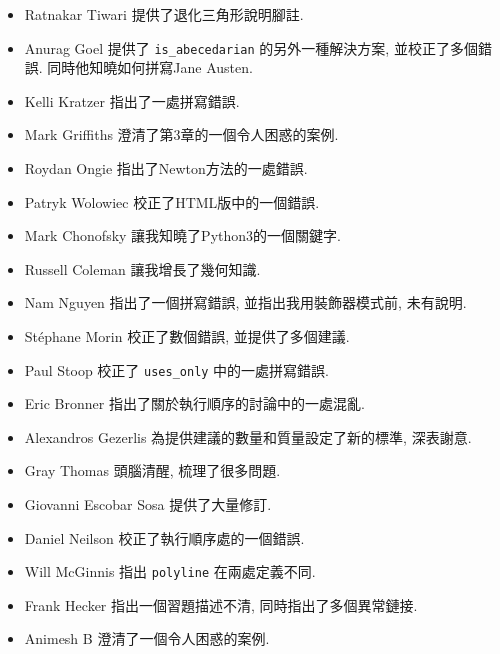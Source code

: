 \documentclass[10pt]{book}
\begin{document}
\begin{itemize}
\item Ratnakar Tiwari 提供了退化三角形說明腳註. 

\item Anurag Goel 提供了 \verb"is_abecedarian"
的另外一種解決方案, 並校正了多個錯誤. 同時他知曉如何拼寫Jane Austen. 

\item Kelli Kratzer 指出了一處拼寫錯誤. 

\item Mark Griffiths 澄清了第3章的一個令人困惑的案例. 

\item Roydan Ongie 指出了Newton方法的一處錯誤. 

\item Patryk Wolowiec 校正了HTML版中的一個錯誤. 

\item Mark Chonofsky 讓我知曉了Python3的一個關鍵字. 

\item Russell Coleman 讓我增長了幾何知識. 

\item Nam Nguyen 指出了一個拼寫錯誤, 並指出我用裝飾器模式前, 未有說明. 

\item St\'{e}phane Morin 校正了數個錯誤, 並提供了多個建議. 

\item Paul Stoop 校正了 \verb+uses_only+ 中的一處拼寫錯誤. 

\item Eric Bronner 指出了關於執行順序的討論中的一處混亂. 

\item Alexandros Gezerlis 為提供建議的數量和質量設定了新的標準, 深表謝意. 

\item Gray Thomas 頭腦清醒, 梳理了很多問題.

\item Giovanni Escobar Sosa 提供了大量修訂. 

\item Daniel Neilson 校正了執行順序處的一個錯誤. 

\item Will McGinnis 指出 {\tt polyline} 在兩處定義不同. 

\item Frank Hecker 指出一個習題描述不清, 同時指出了多個異常鏈接. 

\item Animesh B 澄清了一個令人困惑的案例. 


\end{itemize}
\end{document}
